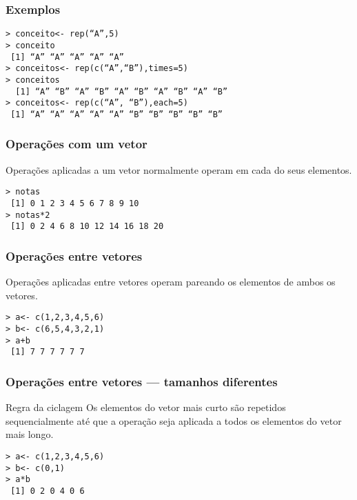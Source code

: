 \documentclass{beamer}
\begin{document}
\begin{frame}
  \frametitle{Exemplos}
\texttt{> conceito<- rep(``A'',5)\\
> conceito\\
~[1] ``A'' ``A'' ``A'' ``A'' ``A'' \\ \vspace{10pt}
> conceitos<- rep(c(``A'',``B''),times=5)\\
> conceitos\\
~ [1] ``A'' ``B'' ``A'' ``B'' ``A'' ``B'' ``A'' ``B'' ``A'' ``B''\\ \vspace{10pt}
> conceitos<- rep(c(``A'', ``B''),each=5)\\
~[1] ``A'' ``A'' ``A'' ``A'' ``A'' ``B'' ``B'' ``B'' ``B'' ``B''
}
\end{frame}
 \begin{frame}
  \frametitle{Operações com um vetor }

Operações aplicadas a um vetor normalmente operam em cada do seus elementos.

\texttt{> notas\\
 ~[1]  0  1  2  3  4  5  6  7  8  9 10\\
> notas*2\\
~[1]  0  2  4  6  8 10 12 14 16 18 20 \\}
 \end{frame}



 \begin{frame}
 \frametitle{Operações entre vetores}
Operações aplicadas entre vetores operam pareando os elementos de ambos os vetores.

\texttt{> a<- c(1,2,3,4,5,6)\\
> b<- c(6,5,4,3,2,1) \\
> a+b \\
~[1] 7 7 7 7 7 7}
 \end{frame}

 \begin{frame}
   \frametitle{Operações entre vetores --- tamanhos diferentes}

   \begin{block}{Regra da ciclagem}
     Os elementos do vetor mais curto são repetidos sequencialmente
     até que a operação seja aplicada a todos os elementos do vetor
     mais longo.
   \end{block}

\texttt{> a<- c(1,2,3,4,5,6)\\
> b<- c(0,1) \\
> a*b \\
~[1] 0 2 0 4 0 6}
 \end{frame}
\end{document}
